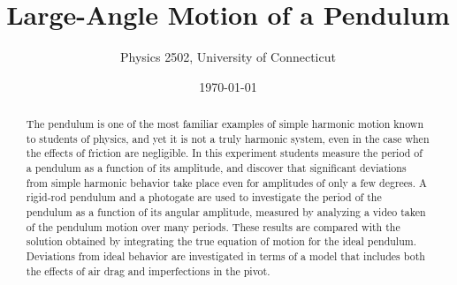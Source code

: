 \documentclass{revtex4}
\begin{document}

\title{Large-Angle Motion of a Pendulum}
\vspace*{5mm}


\author{Physics 2502, University of Connecticut}


\date{\today}

\begin{abstract}
The pendulum is one of the most familiar examples of simple harmonic
motion known to students of physics, and yet it is not a truly harmonic
system, even in the case when the effects of friction are negligible.
In this experiment students measure the period of a pendulum as a function
of its amplitude, and discover that significant deviations from simple
harmonic behavior take place even for amplitudes of only a few degrees.
A rigid-rod pendulum and a photogate are used to investigate the
period of the pendulum as a function of its angular amplitude, measured
by analyzing a video taken of the pendulum motion over many periods.
These results are compared with the solution obtained by integrating the
true equation of motion for the ideal pendulum.  Deviations from ideal
behavior are investigated in terms of a model that includes both the
effects of air drag and imperfections in the pivot.
\end{abstract}
\end{document}
